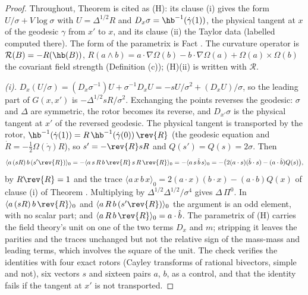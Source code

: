 \begin{proof}
Throughout, Theorem  is cited as (H): its clause (i) gives the form $U/\sigma + V\log\sigma$ with $U = \Delta^{1/2}R$ and $D_{x}\sigma = \hb^{-1}(\dot\gamma(1))$, the physical tangent at $x$ of the geodesic $\gamma$ from $x'$ to $x$, and its clause (ii) the Taylor data (labelled computed there). The form of the parametrix is Fact . The curvature operator is $\mathcal{R}(B) = -R(\hb(B))$, $R(a\wedge b) = a\cdot\nabla\Omega(b) - b\cdot\nabla\Omega(a) + \Omega(a)\times\Omega(b)$ the covariant field strength (Definition (c)); (H)(ii) is written with $\mathcal{R}$.

\emph{(i).} $D_{x}(U/\sigma) = (D_{x}\sigma^{-1})U + \sigma^{-1}D_{x}U = -sU/\sigma^{2} + (D_{x}U)/\sigma$, so the leading part of $G(x, x')$ is $-\Delta^{1/2}sR/\sigma^{2}$. Exchanging the points reverses the geodesic: $\sigma$ and $\Delta$ are symmetric, the rotor becomes its reverse, and $D_{x'}\sigma$ is the physical tangent at $x'$ of the reversed geodesic. The physical tangent is transported by the rotor, $\hb^{-1}(\dot\gamma(1)) = R\,\hb^{-1}(\dot\gamma(0))\,\rev{R}$ (the geodesic equation and $\dot R = -\tfrac12\Omega(\dot\gamma)R$), so $s' = -\rev{R}sR$ and $Q(s') = Q(s) = 2\sigma$. Then
\[
\langle a\,(sR)\,b\,(s'\rev{R})\rangle_{0} = -\langle a\,s\,R\,b\,\rev{R}\,s\,R\,\rev{R}\rangle_{0} = -\langle a\,s\,\hat b\,s\rangle_{0} = -\bigl(2(a\cdot s)(\hat b\cdot s) - (a\cdot\hat b)Q(s)\bigr),
\]
by $R\rev{R} = 1$ and the trace $\langle a\,x\,b\,x\rangle_{0} = 2(a\cdot x)(b\cdot x) - (a\cdot b)Q(x)$ of clause (i) of Theorem . Multiplying by $\Delta^{1/2}\Delta^{1/2}/\sigma^{4}$ gives $\Delta\,\Pi^{0}$. In $\langle a\,(sR)\,b\,\rev{R}\rangle_{0}$ and $\langle a\,R\,b\,(s'\rev{R})\rangle_{0}$ the argument is an odd element, with no scalar part; and $\langle a\,R\,b\,\rev{R}\rangle_{0} = a\cdot\hat b$. The parametrix of (H) carries the field theory's unit on one of the two terms $D_{x}$ and $m$; stripping it leaves the parities and the traces unchanged but not the relative sign of the mass-mass and leading terms, which involves the square of the unit. The check verifies the identities with four exact rotors (Cayley transforms of rational bivectors, simple and not), six vectors $s$ and sixteen pairs $a$, $b$, as a control, and that the identity fails if the tangent at $x'$ is not transported.


\end{proof}
